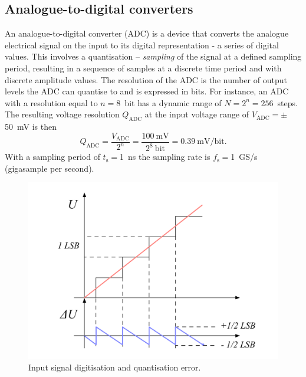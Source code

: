 \subsection{Analogue-to-digital converters}
An analogue-to-digital converter (ADC) is a device that converts the analogue electrical signal on the input to its digital representation - a series of digital values. This involves a quantisation -- \emph{sampling} of the signal at a defined sampling period, resulting in a sequence of samples at a discrete time period and with discrete amplitude values. The resolution of the ADC is the number of output levels the ADC can quantise to and is expressed in bits. For instance, an ADC with a resolution equal to $n=8$~bit  has a dynamic range of $N=2^n=256$~steps. The resulting voltage resolution $Q_\mathrm{ADC}$ at the input voltage range of $V_\mathrm{ADC}=\pm$50~mV is then
\begin{equation}
\label{eq:mvpercnt}
Q_\mathrm{ADC}=\frac{V_\mathrm{ADC}}{2^{n}}  = \frac{100~\mathrm{mV}}{2^8~\mathrm{bit}} = 0.39~\mathrm{mV/bit}.
\end{equation} 
With a sampling period of $t_\mathrm{s}=$1~ns the sampling rate is $f_\mathrm{s}=$1~GS/s (gigasample per second).
\begin{figure}[!t]
\begin{center}
\includegraphics[width=0.6\linewidth]{02_pulse_formation/pics/plots/qerr}
\caption{Input signal digitisation and quantisation error.}
\label{fig:qerr}
\end{center}
\end{figure}

